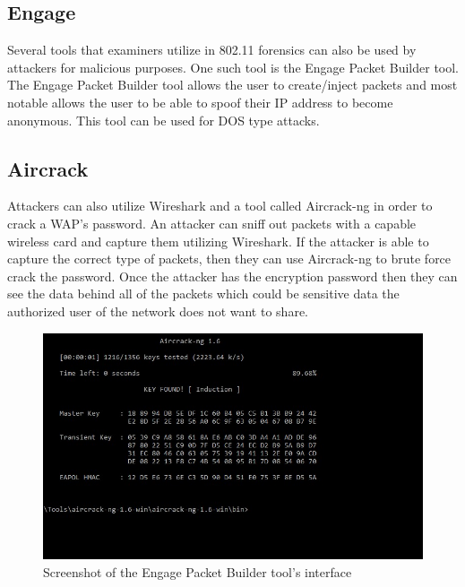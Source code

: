 \documentclass[acmlarge]{acmart}
\begin{document}

\subsection{Engage}

Several tools that examiners utilize in 802.11 forensics can also be used by attackers for malicious purposes. One such tool is the Engage Packet Builder tool. The Engage Packet Builder tool allows the user to create/inject packets and most notable allows the user to be able to spoof their IP address to become anonymous. This tool can be used for DOS type attacks. 


\subsection{Aircrack}

Attackers can also utilize Wireshark and a tool called Aircrack-ng in order to crack a WAP’s password. An attacker can sniff out packets with a capable wireless card and capture them utilizing Wireshark. If the attacker is able to capture the correct type of packets, then they can use Aircrack-ng to brute force crack the password. Once the attacker has the encryption password then they can see the data behind all of the packets which could be sensitive data the authorized user of the network does not want to share. 

\begin{figure}[H]
  \centering
  \includegraphics[width=0.5\linewidth]{imgs/aircrack.jpg}
  \caption{Screenshot of the Engage Packet Builder tool's interface}
  \label{fig:aircrack}
\end{figure}
\end{document}
